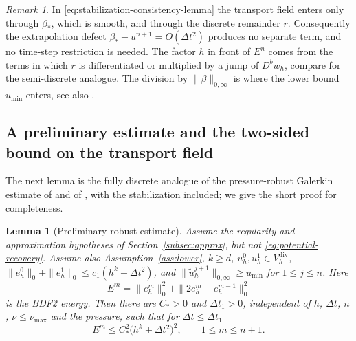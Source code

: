 \documentclass[11pt]{article}
\newtheorem{lemma}{Lemma}
\theoremstyle{remark}\newtheorem{remark}{Remark}
\newcommand{\Vdivh}{V_h^{\mathrm{div}}}
\newcommand{\tu}{\tilde u_h}
\theoremstyle{plain}
\newcommand{\new}[1]{{\color{blue}#1}}
\begin{document}
\begin{remark}
In \eqref{eq:stabilization-consistency-lemma} the transport field enters only through $\beta_*$, which is smooth, and through the discrete remainder $r$. Consequently the extrapolation defect $\beta_*-u^{n+1}=O(\Delta t^2)$ produces no separate term, and no time-step restriction is needed. The factor $h$ in front of $E^n$ comes from the terms in which $r$ is differentiated or multiplied by a jump of $D^bw_h$, compare \cite[Lemma~3.2]{GAN25} for the semi-discrete analogue. The division by $\|\beta\|_{0,\infty}$ is where the lower bound $u_{\min}$ enters, see also \cite[Remark~3.4]{GAN25}.
\end{remark}

\subsection{A preliminary estimate and \new{the two-sided bound on the transport field}}\label{subsec:bootstrap}
\new{The next lemma is the fully discrete analogue of the pressure-robust Galerkin estimate of \cite{SL17} and of \cite[Prop.~3.3]{GAN25}, with the stabilization included; we give the short proof for completeness.}
\begin{lemma}[Preliminary robust estimate]\label{lem:prelim}
Assume the regularity and approximation hypotheses of Section~\ref{subsec:approx}, but not \eqref{eq:potential-recovery}. Assume also Assumption~\ref{ass:lower}, $k\ge d$, $u_h^0,u_h^1\in\Vdivh$, $\|e_h^0\|_0+\|e_h^1\|_0\le c_1(h^k+\Delta t^2)$, and $\|\tu^{j+1}\|_{0,\infty}\ge u_{\min}$ for $1\le j\le n$. Here
\[
E^m=\|e_h^m\|_0^2+\|2e_h^m-e_h^{m-1}\|_0^2
\]
is the BDF2 energy. Then there are $C_*>0$ and $\Delta t_1>0$, independent of $h$, $\Delta t$, $n$, $\nu\le\nu_{\max}$ and the pressure, such that for $\Delta t\le\Delta t_1$
\[
E^{m}\le C_*^2\big(h^{k}+\Delta t^2\big)^2,\qquad 1\le m\le n+1 .
\]
\end{lemma}
\end{document}
